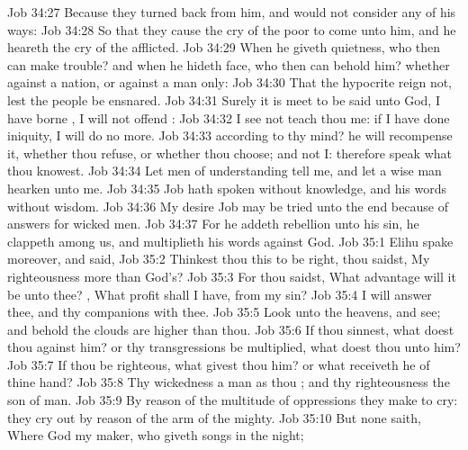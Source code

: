 \vs Job 34:27 Because they turned back from him, and would not consider any of his ways:
\vs Job 34:28 So that they cause the cry of the poor to come unto him, and he heareth the cry of the afflicted.
\vs Job 34:29 When he giveth quietness, who then can make trouble? and when he hideth  face, who then can behold him? whether  against a nation, or against a man only:
\vs Job 34:30 That the hypocrite reign not, lest the people be ensnared.
\vs Job 34:31 Surely it is meet to be said unto God, I have borne , I will not offend :
\vs Job 34:32  I see not teach thou me: if I have done iniquity, I will do no more.
\vs Job 34:33  according to thy mind? he will recompense it, whether thou refuse, or whether thou choose; and not I: therefore speak what thou knowest.
\vs Job 34:34 Let men of understanding tell me, and let a wise man hearken unto me.
\vs Job 34:35 Job hath spoken without knowledge, and his words  without wisdom.
\vs Job 34:36 My desire  Job may be tried unto the end because of  answers for wicked men.
\vs Job 34:37 For he addeth rebellion unto his sin, he clappeth  among us, and multiplieth his words against God.
\vs Job 35:1 Elihu spake moreover, and said,
\vs Job 35:2 Thinkest thou this to be right,  thou saidst, My righteousness  more than God's?
\vs Job 35:3 For thou saidst, What advantage will it be unto thee? , What profit shall I have,  from my sin?
\vs Job 35:4 I will answer thee, and thy companions with thee.
\vs Job 35:5 Look unto the heavens, and see; and behold the clouds  are higher than thou.
\vs Job 35:6 If thou sinnest, what doest thou against him? or  thy transgressions be multiplied, what doest thou unto him?
\vs Job 35:7 If thou be righteous, what givest thou him? or what receiveth he of thine hand?
\vs Job 35:8 Thy wickedness  a man as thou ; and thy righteousness  the son of man.
\vs Job 35:9 By reason of the multitude of oppressions they make  to cry: they cry out by reason of the arm of the mighty.
\vs Job 35:10 But none saith, Where  God my maker, who giveth songs in the night;
